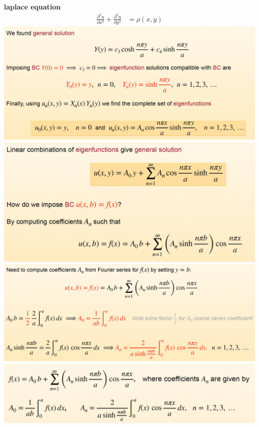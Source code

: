 \documentclass[letterpaper, 8pt]{extarticle}
\begin{document}
\begin{multicols*}{4}
	\textbf{laplace equation}
	\begin{align*}
		\frac{\partial^2u}{\partial x^2} + \frac{\partial^2 u}{\partial y^2} & = \rho(x, y)
	\end{align*}
	\includegraphics[width=\linewidth]{laplace1.jpeg} \\
	\includegraphics[width=\linewidth]{laplace2.jpeg} \\
	\includegraphics[width=\linewidth]{laplace3.jpeg} \\
	\includegraphics[width=\linewidth]{laplace4.png} \\

\end{multicols*}
\end{document}

